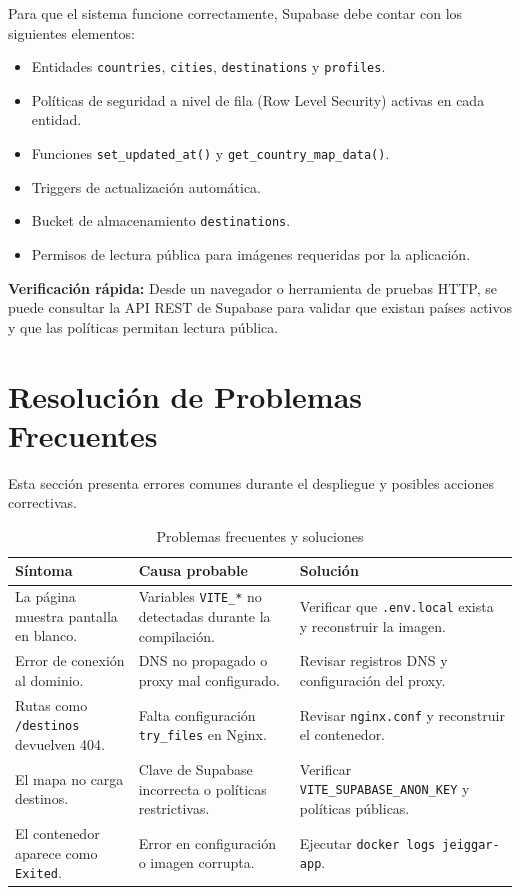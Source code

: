 \documentclass[12pt,letterpaper]{article}
\newcommand{\code}[1]{\nolinkurl{#1}}
\begin{document}
Para que el sistema funcione correctamente, Supabase debe contar con los siguientes elementos:

\begin{itemize}
\item Entidades \code{countries}, \code{cities}, \code{destinations} y \code{profiles}.
\item Políticas de seguridad a nivel de fila (Row Level Security) activas en cada entidad.
\item Funciones \code{set_updated_at()} y \code{get_country_map_data()}.
\item Triggers de actualización automática.
\item Bucket de almacenamiento \code{destinations}.
\item Permisos de lectura pública para imágenes requeridas por la aplicación.
\end{itemize}

\textbf{Verificación rápida:} Desde un navegador o herramienta de pruebas HTTP, se puede consultar la API REST de Supabase para validar que existan países activos y que las políticas permitan lectura pública.

\section{Resolución de Problemas Frecuentes}

Esta sección presenta errores comunes durante el despliegue y posibles acciones correctivas.

\begin{longtable}{|p{}|p{}|p{}|}
\caption{Problemas frecuentes y soluciones}\\
\hline
\textbf{Síntoma} & \textbf{Causa probable} & \textbf{Solución} \\
\hline
La página muestra pantalla en blanco. & Variables \code{VITE_*} no detectadas durante la compilación. & Verificar que \code{.env.local} exista y reconstruir la imagen. \\
\hline
Error de conexión al dominio. & DNS no propagado o proxy mal configurado. & Revisar registros DNS y configuración del proxy. \\
\hline
Rutas como \code{/destinos} devuelven 404. & Falta configuración \code{try_files} en Nginx. & Revisar \code{nginx.conf} y reconstruir el contenedor. \\
\hline
El mapa no carga destinos. & Clave de Supabase incorrecta o políticas restrictivas. & Verificar \code{VITE_SUPABASE_ANON_KEY} y políticas públicas. \\
\hline
El contenedor aparece como \code{Exited}. & Error en configuración o imagen corrupta. & Ejecutar \code{docker logs jeiggar-app}. \\
\hline
\end{longtable}
\end{document}
